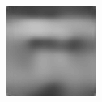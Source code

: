 \begin{figure}[H]
\begin{subfigure}[t]{0.15\textwidth}
  \end{subfigure}
  \begin{subfigure}[t]{0.15\textwidth}
    \centering
    \includegraphics[width=\linewidth]{img/one-trial/prediction_1_cnnv4.png}
  \end{subfigure}
  \\
    \vspace{0.1cm}
  

\end{figure}
